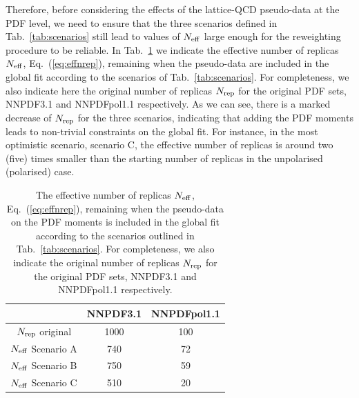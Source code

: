     Therefore, before considering the effects
    of the lattice-QCD pseudo-data at the PDF
    level, we need to ensure that the
    three scenarios defined
    in Tab.~\ref{tab:scenarios} still lead
    to values of $N_{\rm eff}$ large enough for
    the reweighting procedure to be reliable.
In Tab.~\ref{tab:neff} we indicate the effective number of replicas
    $N_{\rm eff}$, Eq.~(\ref{eq:effnrep}), remaining when the pseudo-data
    are included in the global
    fit according to the scenarios of Tab.~\ref{tab:scenarios}.
    For completeness, we also indicate here the original number
    of replicas $N_{\rm rep}$ for the original
    PDF sets, NNPDF3.1   and NNPDFpol1.1 respectively.
    As we can see, there is a marked decrease of $N_{\rm rep}$
    for the three scenarios, indicating that adding the
    PDF moments leads to non-trivial constraints on the global
    fit.
    For instance, in the most optimistic scenario,
    scenario C, the effective number of replicas is around two (five) times
    smaller than the starting number of replicas in the unpolarised
    (polarised) case.

%
\begin{table}[h!]
  \centering
  \renewcommand{\arraystretch}{1.3} 
  \begin{tabular}{c|c|c}
    \hline
    &  NNPDF3.1  &  NNPDFpol1.1 \\
    \hline
    \hline
    $N_{\rm rep}$ original   &   1000 &  100   \\
    \hline
     $N_{\rm eff}$ Scenario A    &   740  &  72   \\
     $N_{\rm eff}$ Scenario B    &   750   &   59  \\
     $N_{\rm eff}$ Scenario C   &   510  &   20  \\
    \hline
  \end{tabular}
  \caption{\small The effective number of replicas
    $N_{\rm eff}$, Eq.~(\ref{eq:effnrep}), remaining when the pseudo-data
    on the PDF moments is included in the global
    fit according to the scenarios outlined
    in Tab.~\ref{tab:scenarios}.
    For completeness, we also indicate the original number
    of replicas $N_{\rm rep}$ for the original
    PDF sets, NNPDF3.1   and NNPDFpol1.1 respectively.
    \label{tab:neff}
  }
\end{table}

